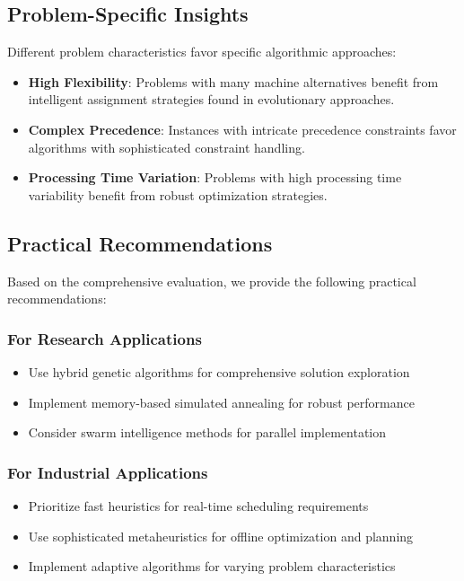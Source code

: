 \documentclass[11pt,a4paper]{article}
\begin{document}
\subsection{Problem-Specific Insights}

Different problem characteristics favor specific algorithmic approaches:

\begin{itemize}
    \item \textbf{High Flexibility}: Problems with many machine alternatives benefit from intelligent assignment strategies found in evolutionary approaches.
    \item \textbf{Complex Precedence}: Instances with intricate precedence constraints favor algorithms with sophisticated constraint handling.
    \item \textbf{Processing Time Variation}: Problems with high processing time variability benefit from robust optimization strategies.
\end{itemize}

\subsection{Practical Recommendations}

Based on the comprehensive evaluation, we provide the following practical recommendations:

\subsubsection{For Research Applications}

\begin{itemize}
    \item Use hybrid genetic algorithms for comprehensive solution exploration
    \item Implement memory-based simulated annealing for robust performance
    \item Consider swarm intelligence methods for parallel implementation
\end{itemize}

\subsubsection{For Industrial Applications}

\begin{itemize}
    \item Prioritize fast heuristics for real-time scheduling requirements
    \item Use sophisticated metaheuristics for offline optimization and planning
    \item Implement adaptive algorithms for varying problem characteristics
\end{itemize}
\end{document}
